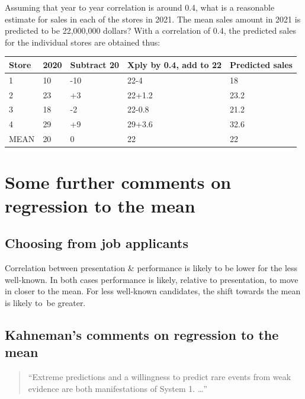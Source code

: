 \documentclass[
  10pt,
  b5paper]{book}
\begin{document}
Assuming that year to year correlation is around 0.4,
what is a reasonable estimate for sales in each of the
stores in 2021. The mean sales amount in 2021 is predicted to be 22,000,000 dollars?
With a correlation of 0.4, the predicted sales for the individual stores are
obtained thus:

\begin{longtable}[]{@{}lllll@{}}
\toprule
Store & 2020 & Subtract 20 & Xply by 0.4, add to 22 & Predicted sales \\
\midrule
\endhead
1 & 10 & -10 & 22-4 & 18 \\
2 & 23 & +3 & 22+1.2 & 23.2 \\
3 & 18 & -2 & 22-0.8 & 21.2 \\
4 & 29 & +9 & 29+3.6 & 32.6 \\
MEAN & 20 & 0 & 22 & 22 \\
\bottomrule
\end{longtable}

\hypertarget{some-further-comments-on-regression-to-the-mean}{%
\section{Some further comments on regression to the mean}\label{some-further-comments-on-regression-to-the-mean}}

\hypertarget{choosing-from-job-applicants}{%
\subsection*{Choosing from job applicants}\label{choosing-from-job-applicants}}

Correlation between presentation \& performance is likely to
be lower for the less well-known. In both cases performance
is likely, relative to presentation, to move in closer to the
mean. For less well-known candidates, the shift towards the
mean is likely to~be greater.

\hypertarget{kahnemans-comments-on-regression-to-the-mean}{%
\subsection*{Kahneman's comments on regression to the mean}\label{kahnemans-comments-on-regression-to-the-mean}}

\begin{quote}
``Extreme predictions and a willingness to predict rare events from
weak evidence are both manifestations of System 1. \ldots{}''
\end{quote}
\end{document}
